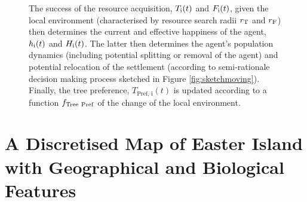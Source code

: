 \begin{figure}[H]
{		The success of the resource acquisition, $T_{\rm i}(t)$ and $F_{\rm i} (t)$, given the local environment (characterised by resource search radii $r_{\rm T}$ and $r_{\rm F}$) then determines the current and effective happiness of the agent, $h_{\rm i}(t)$ and $H_{\rm i}(t)$. %
		The latter then determines the agent's population dynamics (including potential splitting or removal of the agent) and potential relocation of the settlement (according to semi-rationale decision making process sketched in Figure \ref{fig:sketchmoving}).
		Finally, the tree preference, $T_\text{Pref, i}(t)$ is updated according to a function $f_{\rm Tree \ Pref}$ of the change of the local environment.
	}
	\label{fig:SketchABM}
\end{figure}

\FloatBarrier
\section{A Discretised Map of Easter Island with Geographical and Biological Features}\label{sec:CreateMap}
